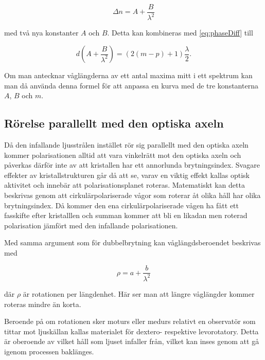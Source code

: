 \documentclass[a4paper]{article}
\begin{document}
\begin{equation}
	\Delta n = A + \frac{B}{\lambda^2}
	\label{eq:deltaCauchy}
\end{equation}

med två nya konstanter $A$ och $B$. Detta kan kombineras med \eqref{eq:phaseDiff} till

\begin{equation}
	d \left(A + \frac{B}{\lambda^2}\right) = \left(2 (m - p) + 1\right)\frac{\lambda}{2}\text{.}
	\label{eq:cauchyMax}
\end{equation}

Om man antecknar våglängderna av ett antal maxima mitt i ett spektrum kan man då använda denna formel för att anpassa en kurva med de tre konstanterna $A$, $B$ och $m$.

\subsection{Rörelse parallellt med den optiska axeln}

Då den infallande ljusstrålen instället rör sig parallellt med den optiska axeln kommer polarisationen alltid att vara vinkelrätt mot den optiska axeln och påverkas därför inte av att kristallen har ett annorlunda brytningsindex. Svagare effekter av kristallstrukturen går då att se, varav en viktig effekt kallas optisk aktivitet och innebär att polarisationsplanet roteras. Matematiskt kan detta beskrivas genom att cirkulärpolariserade vågor som roterar åt olika håll har olika brytningsindex. Då kommer den ena cirkulärpolariserade vågen ha fått ett fasskifte efter kristalllen och summan kommer att bli en likadan men roterad polarisation jämfört med den infallande polarisationen. \cite{labManual} \cite[pp.~387--391]{pearsonIntroOpt}

Med samma argument som för dubbelbrytning kan våglängdsberoendet beskrivas med \cite{labManual}

\begin{equation}\label{eq:rotary}
	\rho = a + \frac{b}{\lambda^2}
\end{equation}

där $\rho$ är rotationen per längdenhet. Här ser man att längre våglängder kommer roteras mindre än korta.

Beroende på om rotationen sker moturs eller medurs relativt en observatör som tittar mot ljuskällan kallas materialet för dextero- respektive levorotatory. Detta är oberoende av vilket håll som ljuset infaller från, vilket kan inses genom att gå igenom processen baklänges. \cite{labManual} \cite[p.~387]{pearsonIntroOpt}
\end{document}
